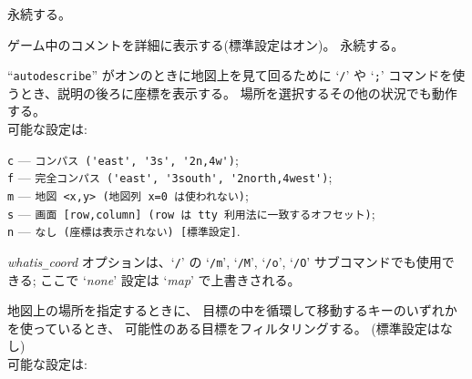 永続する。
\item[\ib{verbose}]
ゲーム中のコメントを詳細に表示する(標準設定はオン)。
永続する。
\item[\ib{whatis\verb+_+coord}]
``{\tt autodescribe}'' がオンのときに地図上を見て回るために
`{\tt /}' や `{\tt ;}' コマンドを使うとき、説明の後ろに座標を表示する。
場所を選択するその他の状況でも動作する。\\

可能な設定は:

{\tt c} --- \verb#コンパス ('east', '3s', '2n,4w')#;\\
{\tt f} --- \verb#完全コンパス ('east', '3south', '2north,4west')#;\\
{\tt m} --- \verb#地図 <x,y> (地図列 x=0 は使われない)#;\\
{\tt s} --- \verb#画面 [row,column] (row は tty 利用法に一致するオフセット)#;\\
{\tt n} --- \verb#なし (座標は表示されない) [標準設定]#.

{\it whatis\verb+_+coord\/}
オプションは、`{\tt /}' の
`{\tt /m}', `{\tt /M}', `{\tt /o}', `{\tt /O}' サブコマンドでも使用できる;
ここで `{\it none\/}' 設定は `{\it map}' で上書きされる。
\item[\ib{whatis\verb+_+filter}]
地図上の場所を指定するときに、
目標の中を循環して移動するキーのいずれかを使っているとき、
可能性のある目標をフィルタリングする。
(標準設定はなし)\\
可能な設定は:

